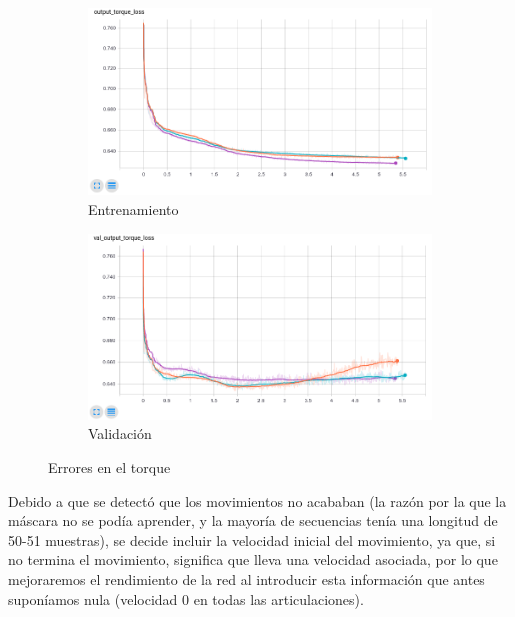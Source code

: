 \begin{figure}[]
	\begin{subfigure}{0.9\textwidth}
		\centering
		\includegraphics[width=\linewidth]{imagenes/resultados/torque_final.png}
		\caption{Entrenamiento}
		\label{fig:resultados/torque_final}
	\end{subfigure}
	\begin{subfigure}{0.9\textwidth}
		\centering
		\includegraphics[width=\linewidth]{imagenes/resultados/val_torque_final.png}
		\caption{Validación}
		\label{fig:resultados/val_torque_final}
	\end{subfigure}
	\caption{Errores en el torque}
	\label{fig:resultados/final}
\end{figure}

Debido a que se detectó que los movimientos no acababan (la razón por la que la máscara no se podía aprender, y la mayoría de secuencias tenía una longitud de 50-51 muestras), se decide incluir la velocidad inicial del movimiento, ya que, si no termina el movimiento, significa que lleva una velocidad asociada, por lo que mejoraremos el rendimiento de la red al introducir esta información que antes suponíamos nula (velocidad 0 en todas las articulaciones).

